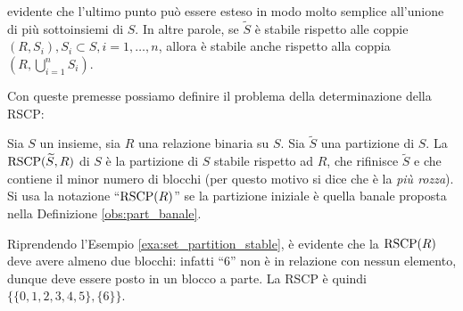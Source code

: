 \accente evidente che l'ultimo punto può essere esteso in modo molto semplice all'unione di più sottoinsiemi di $S$. In altre parole, se $\widetilde{S}$ è stabile rispetto alle coppie $(R,S_i), S_i \subset S, i = 1, \dots, n$, allora è stabile anche rispetto alla coppia $(R, \bigcup_{i=1}^{n} S_i)$.

Con queste premesse possiamo definire il problema della determinazione della RSCP:
\begin{definition}
    Sia $S$ un insieme, sia $R$ una relazione binaria su $S$. Sia $\widetilde{S}$ una partizione di $S$. La $\textup{RSCP}(\widetilde{S},R)$ di $S$ è la partizione di $S$ stabile rispetto ad $R$, che rifinisce $\widetilde{S}$ e che contiene il minor numero di blocchi (per questo motivo si dice che è la \emph{più rozza}).\\
    Si usa la notazione ``$\textup{RSCP}(R)$'' se la partizione iniziale è quella banale proposta nella Definizione \ref{obs:part_banale}.
\end{definition}
\begin{example}
    Riprendendo l'Esempio \ref*{exa:set_partition_stable}, è evidente che la $\textup{RSCP}(R)$ deve avere almeno due blocchi: infatti ``6'' non è in relazione con nessun elemento, dunque deve essere posto in un blocco a parte. La RSCP è quindi $\{\{0,1,2,3,4,5\},\{6\}\}$.
\end{example}

